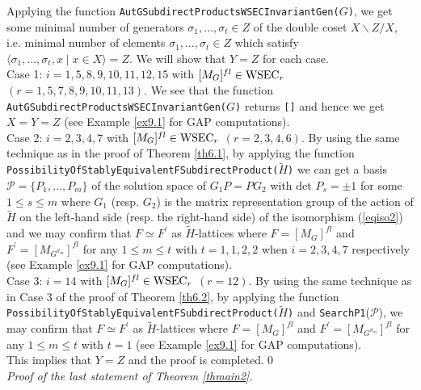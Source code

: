 \documentclass{amsart}
\theoremstyle{plain}
\theoremstyle{definition}
\theoremstyle{remark}
\begin{document}
Applying the function 
{\tt AutGSubdirectProductsWSECInvariantGen(}$G${\tt)}, 
we get some minimal number of generators 
$\sigma_1,\ldots,\sigma_t\in Z$ of the double coset $X\backslash Z/X$, i.e. 
minimal number of elements $\sigma_1,\ldots,\sigma_t\in Z$ which satisfy 
$\langle \sigma_1,\ldots,\sigma_t,x\mid x\in X\rangle=Z$. 
We will show that $Y=Z$ for each case.\\

Case 1: $i=1,5,8,9,10,11,12,15$ with 
$[M_G]^{fl}\in {\rm WSEC}_r$ $(r=1,5,7,8,9,10,11,13)$. 
We see that the function {\tt AutGSubdirectProductsWSECInvariantGen(}$G${\tt)} 
returns {\tt []} and hence we get $X=Y=Z$ (see Example \ref{ex9.1} for GAP computations).\\

Case 2: $i=2,3,4,7$ with 
$[M_G]^{fl}\in {\rm WSEC}_r$ $(r=2,3,4,6)$. 
By using the same technique as in the proof of Theorem \ref{th6.1}, 
by applying the function 
{\tt PossibilityOfStablyEquivalentFSubdirectProduct($\widetilde{H}$)} 
we can get a basis $\mathcal{P}=\{P_1,\dots,P_m\}$ 
of the solution space of $G_1P=PG_2$ 
with det $P_s=\pm 1$ for some $1\leq s\leq m$  
where $G_1$ (resp. $G_2$) 
is the matrix representation group of the action of 
$\widetilde{H}$ on the left-hand side 
(resp. the right-hand side) of the isomorphism (\ref{eqiso2}) 
and 
we may confirm that $F\simeq F^\prime$ as $\widetilde{H}$-lattices 
where $F=[M_G]^{fl}$ and $F^\prime=[M_{G^{\sigma_m}}]^{fl}$ 
for any $1\leq m\leq t$ with $t=1,1,2,2$ when $i=2,3,4,7$ respectively 
(see Example \ref{ex9.1} for GAP computations).\\

Case 3: $i=14$ with $[M_G]^{fl}\in {\rm WSEC}_r$ $(r=12)$. 
By using the same technique as in Case 3 of the proof of Theorem \ref{th6.2}, 
by applying the function 
{\tt PossibilityOfStablyEquivalentFSubdirectProduct($\widetilde{H}$)}  
and {\tt SearchP1}($\mathcal{P}$), 
we may confirm that $F\simeq F^\prime$ as $\widetilde{H}$-lattices 
where $F=[M_G]^{fl}$ and $F^\prime=[M_{G^{\sigma_m}}]^{fl}$ 
for any $1\leq m\leq t$ with $t=1$ (see Example \ref{ex9.1} for GAP computations).\\

This implies that $Y=Z$ and the proof is completed.\qed\\

{\it Proof of the last statement of {Theorem \ref{thmain2}}.}
\end{document}
